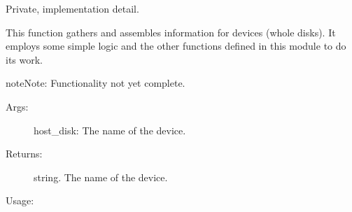 \documentclass[letterpaper,10pt,english]{sphinxmanual}
\begin{document}
\begin{fulllineitems}
\label{\detokenize{cygwin:getdevinfo.cygwin.get_device_info}}
Private, implementation detail.

This function gathers and assembles information for devices (whole disks).
It employs some simple logic and the other functions defined in this
module to do its work.

\begin{sphinxadmonition}{note}{Note:}
Functionality not yet complete.
\end{sphinxadmonition}
\begin{description}
\item[{Args:}] \leavevmode
host\_disk:  The name of the device.

\item[{Returns:}] \leavevmode
string.     The name of the device.

\end{description}

Usage:

\begin{sphinxVerbatim}[commandchars=\\\{\}]
  
\end{sphinxVerbatim}

\end{fulllineitems}

\end{document}
